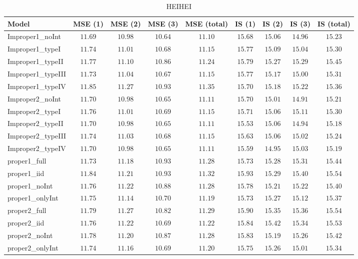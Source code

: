 \begin{table}

\caption{\label{tab:model-choice-sc7}HEIHEI}
\centering
\begin{tabular}{lcccccccc}
\hline
Model  & MSE (1) & MSE (2) & MSE (3) & MSE (total) & IS (1) & IS (2) & IS (3) & \multicolumn{1}{c}{IS (total)} \\ 
\hline
Improper1_noInt  & $11.69$ & $10.98$ & $10.64$ & $11.10$ & $15.68$ & $15.06$ & $14.96$ & $15.23$ \\
Improper1_typeI  & $11.74$ & $11.01$ & $10.68$ & $11.15$ & $15.77$ & $15.09$ & $15.04$ & $15.30$ \\
Improper1_typeII  & $11.77$ & $11.10$ & $10.86$ & $11.24$ & $15.79$ & $15.27$ & $15.29$ & $15.45$ \\
Improper1_typeIII  & $11.73$ & $11.04$ & $10.67$ & $11.15$ & $15.77$ & $15.17$ & $15.00$ & $15.31$ \\
Improper1_typeIV  & $11.85$ & $11.27$ & $10.93$ & $11.35$ & $15.70$ & $15.18$ & $15.22$ & $15.36$ \\
Improper2_noInt  & $11.70$ & $10.98$ & $10.65$ & $11.11$ & $15.70$ & $15.01$ & $14.91$ & $15.21$ \\
Improper2_typeI  & $11.76$ & $11.01$ & $10.69$ & $11.15$ & $15.71$ & $15.06$ & $15.11$ & $15.30$ \\
Improper2_typeII  & $11.70$ & $10.98$ & $10.65$ & $11.11$ & $15.53$ & $15.06$ & $14.94$ & $15.18$ \\
Improper2_typeIII  & $11.74$ & $11.03$ & $10.68$ & $11.15$ & $15.63$ & $15.06$ & $15.02$ & $15.24$ \\
Improper2_typeIV  & $11.70$ & $10.98$ & $10.65$ & $11.11$ & $15.59$ & $14.95$ & $15.03$ & $15.19$ \\
proper1_full  & $11.73$ & $11.18$ & $10.93$ & $11.28$ & $15.73$ & $15.28$ & $15.31$ & $15.44$ \\
proper1_iid  & $11.84$ & $11.21$ & $10.93$ & $11.32$ & $15.93$ & $15.29$ & $15.40$ & $15.54$ \\
proper1_noInt  & $11.76$ & $11.22$ & $10.88$ & $11.28$ & $15.78$ & $15.21$ & $15.22$ & $15.40$ \\
proper1_onlyInt  & $11.75$ & $11.14$ & $10.70$ & $11.19$ & $15.73$ & $15.27$ & $15.12$ & $15.37$ \\
proper2_full  & $11.79$ & $11.27$ & $10.82$ & $11.29$ & $15.90$ & $15.35$ & $15.36$ & $15.54$ \\
proper2_iid  & $11.76$ & $11.22$ & $10.69$ & $11.22$ & $15.84$ & $15.42$ & $15.34$ & $15.53$ \\
proper2_noInt  & $11.78$ & $11.20$ & $10.87$ & $11.28$ & $15.83$ & $15.19$ & $15.26$ & $15.42$ \\
proper2_onlyInt  & $11.74$ & $11.16$ & $10.69$ & $11.20$ & $15.75$ & $15.26$ & $15.01$ & $15.34$ \\
\hline 
\end{tabular}


\end{table}